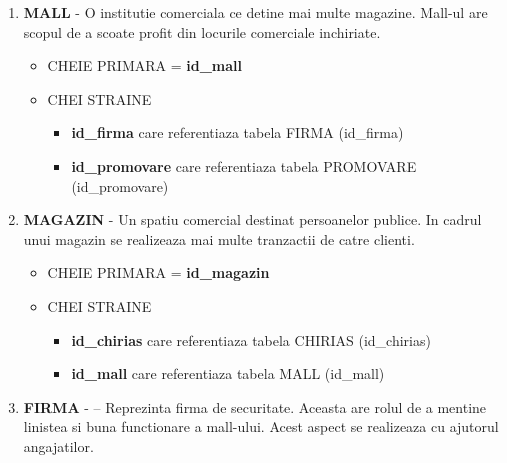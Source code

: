 \begin{enumerate}
    \item \textbf{MALL}
    - O institutie comerciala ce detine mai multe magazine. Mall-ul are scopul
    de a scoate profit din locurile comerciale inchiriate.

    \begin{itemize}
        \item CHEIE PRIMARA = \textbf{id\_mall}
        \item CHEI STRAINE 
                            \begin{itemize}
                                \item \textbf{id\_firma} care referentiaza tabela FIRMA (id\_firma)
                                \item \textbf{id\_promovare} care referentiaza tabela PROMOVARE (id\_promovare)
                            \end{itemize}
            
    \end{itemize}

    \vspace{0.5cm}
    
    \item \textbf{MAGAZIN}
    - Un spatiu comercial destinat persoanelor publice. In cadrul unui
magazin se realizeaza mai multe tranzactii de catre clienti.

    \begin{itemize}
        \item CHEIE PRIMARA = \textbf{id\_magazin}
        \item CHEI STRAINE 
                            \begin{itemize}
                                \item \textbf{id\_chirias} care referentiaza tabela CHIRIAS (id\_chirias)
                                \item \textbf{id\_mall} care referentiaza tabela MALL (id\_mall)
                            \end{itemize}
            
    \end{itemize}

    \vspace{0.5cm}

    \item \textbf{FIRMA}
    - – Reprezinta firma de securitate. Aceasta are rolul de a mentine linistea
si buna functionare a mall-ului. Acest aspect se realizeaza cu ajutorul angajatilor.


\end{enumerate}
